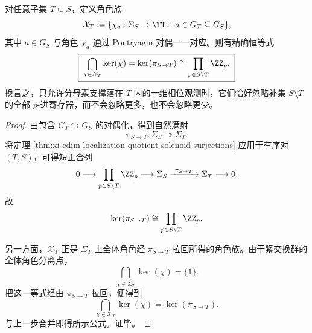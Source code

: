 \begin{theorem}\label{thm:xi-cdim-localization-solenoid-character-family-sees-exact-prime-register-quotient}
对任意子集 \(T\subseteq S\)，定义角色族
\[
\mathcal X_T
:=
\{\chi_a:\Sigma_S\to \TT:\ a\in G_T\subseteq G_S\},
\]
其中 \(a\in G_S\) 与角色 \(\chi_a\) 通过 Pontryagin 对偶一一对应。则有精确恒等式
\[
\boxed{\;
\bigcap_{\chi\in\mathcal X_T}\ker(\chi)
=
\ker(\pi_{S\to T})
\cong
\prod_{p\in S\setminus T}\ZZ_p.\;}
\]
换言之，只允许分母素支撑落在 \(T\) 内的一维相位观测时，它们恰好忽略补集 \(S\setminus T\) 的全部 \(p\)-进寄存器，而不会忽略更多，也不会忽略更少。
\end{theorem}
\begin{proof}
由包含 \(G_T\hookrightarrow G_S\) 的对偶化，得到自然满射
\[
\pi_{S\to T}:\Sigma_S\twoheadrightarrow \Sigma_T.
\]
将定理 \ref{thm:xi-cdim-localization-quotient-solenoid-surjections} 应用于有序对 \((T,S)\)，可得短正合列
\[
0\longrightarrow \prod_{p\in S\setminus T}\ZZ_p
\longrightarrow \Sigma_S
\xrightarrow{\ \pi_{S\to T}\ }
\Sigma_T
\longrightarrow 0.
\]
故
\[
\ker(\pi_{S\to T})\cong \prod_{p\in S\setminus T}\ZZ_p.
\]

另一方面，\(\mathcal X_T\) 正是 \(\Sigma_T\) 上全体角色经 \(\pi_{S\to T}\) 拉回所得的角色族。由于紧交换群的全体角色分离点，
\[
\bigcap_{\chi\in \widehat{\Sigma_T}}\ker(\chi)=\{1\}.
\]
把这一等式经由 \(\pi_{S\to T}\) 拉回，便得到
\[
\bigcap_{\chi\in\mathcal X_T}\ker(\chi)=\ker(\pi_{S\to T}).
\]
与上一步合并即得所示公式。证毕。
\end{proof}



\endinput
